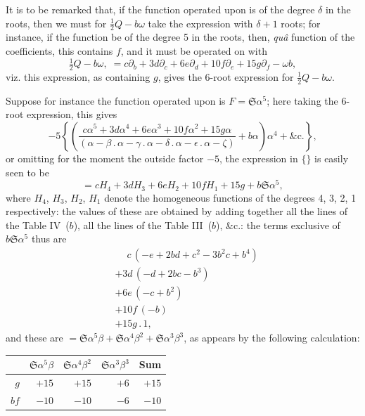 \documentclass[11pt,a4paper]{book}
\begin{document}
{{{\setcounter{art}{29}
\begin{art}
It is to be remarked that, if the function operated upon is of the degree $\delta$ in the roots, then we must for $\frac{1}{2}Q - b\omega$ take the expression with $\delta + 1$ roots; for instance, if the function be of the degree 5 in the roots, then, \textit{qu\^{a}} function of the coefficients, this contains $f$, and it must be operated on with
\[
\tfrac{1}{2}Q - b\omega,\; = c\partial_{b} + 3d\partial_{c} + 6e\partial_{d} + 10f\partial_{e} + 15g\partial_{f} - \omega b,
\]
viz. this expression, as containing $g$, gives the 6-root expression for $\frac{1}{2}Q - b\omega$.
\end{art}

\setcounter{art}{30}
\begin{art}
Suppose for instance the function operated upon is $F = \mathfrak{S}\alpha^{5}$; here taking the 6-root expression, this gives
\[
-5\left\{\left(\frac{c\alpha^{5} + 3d\alpha^{4} + 6e\alpha^{3} + 10f\alpha^{2} + 15g\alpha}{(\alpha - \beta\,.\,\alpha - \gamma\,.\,\alpha - \delta\,.\,\alpha - \epsilon\,.\,\alpha - \zeta)} + b\alpha\right)\alpha^{4} + \&\mathrm{c}.\right\},
\]
or omitting for the moment the outside factor $-5$, the expression in $\{\}$ is easily seen to be
\[
= cH_{4} + 3dH_{3} + 6eH_{2} + 10fH_{1} + 15g + b\mathfrak{S}\alpha^{5},
\]
where $H_{4}$, $H_{3}$, $H_{2}$, $H_{1}$ denote the homogeneous functions of the degrees 4, 3, 2, 1 respectively: the values of these are obtained by adding together all the lines of the Table IV~($b$), all the lines of the Table III~($b$), \&c.: the terms exclusive of $b\mathfrak{S}\alpha^{5}$ thus are
\begin{align*}
&\phantom{+}c\,(-e + 2bd + c^{2} - 3b^{2}c + b^{4})\\
&+ 3d\,(-d + 2bc - b^{3})\\
&+ 6e\,(-c + b^{2})\\
&+ 10f\,(-b)\\
&+ 15g\,.\,1,
\end{align*}
and these are $= \mathfrak{S}\alpha^{5}\beta + \mathfrak{S}\alpha^{4}\beta^{2} + \mathfrak{S}\alpha^{3}\beta^{3}$, as appears by the following calculation:
\begin{center}
\begin{tabular}{r|rrr|r}
 & $\mathfrak{S}\alpha^{5}\beta$ & $\mathfrak{S}\alpha^{4}\beta^{2}$ & $\mathfrak{S}\alpha^{3}\beta^{3}$ & Sum \\
\hline
$g$ & $+15$ & $+15$ & $+6$ & $+15$ \\
$bf$ & $-10$ & $-10$ & $-6$ & $-10$ \\

\end{tabular}
\end{center}
\end{art}}}}
\end{document}
